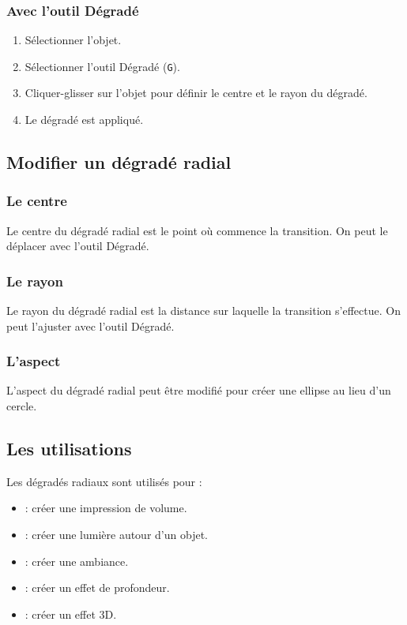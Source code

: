\subsubsection{Avec l'outil Dégradé}

\begin{enumerate}
    \item Sélectionner l'objet.
    \item Sélectionner l'outil Dégradé (\texttt{G}).
    \item Cliquer-glisser sur l'objet pour définir le centre et le rayon du dégradé.
    \item Le dégradé est appliqué.
\end{enumerate}

\subsection{Modifier un dégradé radial}

\subsubsection{Le centre}

Le centre du dégradé radial est le point où commence la transition. On peut le déplacer avec l'outil Dégradé.

\subsubsection{Le rayon}

Le rayon du dégradé radial est la distance sur laquelle la transition s'effectue. On peut l'ajuster avec l'outil Dégradé.

\subsubsection{L'aspect}

L'aspect du dégradé radial peut être modifié pour créer une ellipse au lieu d'un cercle.

\subsection{Les utilisations}

Les dégradés radiaux sont utilisés pour :

\begin{itemize}
    \item {} : créer une impression de volume.
    \item {} : créer une lumière autour d'un objet.
    \item {} : créer une ambiance.
    \item {} : créer un effet de profondeur.
    \item {} : créer un effet 3D.
\end{itemize}

